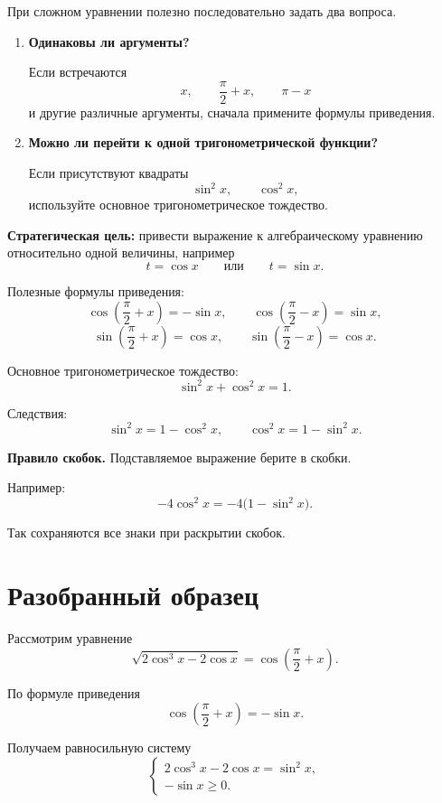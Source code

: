 \documentclass[a4paper,12pt]{article}
\begin{document}
При сложном уравнении полезно последовательно задать два вопроса.

\begin{enumerate}

  \item
  \textbf{Одинаковы ли аргументы?}

  Если встречаются
  \[
  x,\qquad
  \frac{\pi}{2}+x,\qquad
  \pi-x
  \]
  и другие различные аргументы, сначала примените формулы приведения.

  \item
  \textbf{Можно ли перейти к одной тригонометрической функции?}

  Если присутствуют квадраты
  \[
  \sin^2x,\qquad \cos^2x,
  \]
  используйте основное тригонометрическое тождество.

\end{enumerate}

\begin{keybox}
\textbf{Стратегическая цель:}
привести выражение к алгебраическому уравнению относительно одной величины, например
\[
t=\cos x
\qquad\text{или}\qquad
t=\sin x.
\]
\end{keybox}

Полезные формулы приведения:
\[
\cos\left(\frac{\pi}{2}+x\right)=-\sin x,
\qquad
\cos\left(\frac{\pi}{2}-x\right)=\sin x,
\]
\[
\sin\left(\frac{\pi}{2}+x\right)=\cos x,
\qquad
\sin\left(\frac{\pi}{2}-x\right)=\cos x.
\]

Основное тригонометрическое тождество:
\[
\sin^2x+\cos^2x=1.
\]

Следствия:
\[
\sin^2x=1-\cos^2x,
\qquad
\cos^2x=1-\sin^2x.
\]

\begin{noteBox}
\textbf{Правило скобок.}
Подставляемое выражение берите в скобки.

Например:
\[
-4\cos^2x
=
-4\bigl(1-\sin^2x\bigr).
\]

Так сохраняются все знаки при раскрытии скобок.
\end{noteBox}

\section{Разобранный образец}

Рассмотрим уравнение
\[
\sqrt{2\cos^3x-2\cos x}
=
\cos\left(\frac{\pi}{2}+x\right).
\]

По формуле приведения
\[
\cos\left(\frac{\pi}{2}+x\right)
=
-\sin x.
\]

Получаем равносильную систему
\[
\begin{cases}
2\cos^3x-2\cos x=\sin^2x,\\
-\sin x\ge0.
\end{cases}
\]
\end{document}
